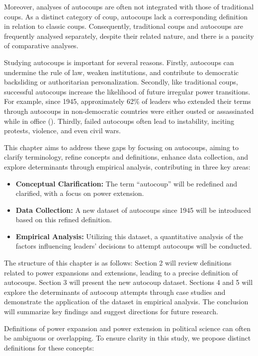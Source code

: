 \documentclass[
  12pt,
]{report}
\begin{document}
Moreover, analyses of autocoups are often not integrated with those of
traditional coups. As a distinct category of coup, autocoups lack a
corresponding definition in relation to classic coups. Consequently,
traditional coups and autocoups are frequently analysed separately,
despite their related nature, and there is a paucity of comparative
analyses.

Studying autocoups is important for several reasons. Firstly, autocoups
can undermine the rule of law, weaken institutions, and contribute to
democratic backsliding or authoritarian personalization. Secondly, like
traditional coups, successful autocoups increase the likelihood of
future irregular power transitions. For example, since 1945,
approximately 62\% of leaders who extended their terms through autocoups
in non-democratic countries were either ousted or assassinated while in
office (). Thirdly, failed
autocoups often lead to instability, inciting protests, violence, and
even civil wars.

This chapter aims to address these gaps by focusing on autocoups, aiming
to clarify terminology, refine concepts and definitions, enhance data
collection, and explore determinants through empirical analysis,
contributing in three key areas:

\begin{itemize}
\item
  \textbf{Conceptual Clarification:} The term ``autocoup'' will be
  redefined and clarified, with a focus on power extension.
\item
  \textbf{Data Collection:} A new dataset of autocoups since 1945 will
  be introduced based on this refined definition.
\item
  \textbf{Empirical Analysis:} Utilizing this dataset, a quantitative
  analysis of the factors influencing leaders' decisions to attempt
  autocoups will be conducted.
\end{itemize}

The structure of this chapter is as follows: Section 2 will review
definitions related to power expansions and extensions, leading to a
precise definition of autocoups. Section 3 will present the new autocoup
dataset. Sections 4 and 5 will explore the determinants of autocoup
attempts through case studies and demonstrate the application of the
dataset in empirical analysis. The conclusion will summarize key
findings and suggest directions for future research.

Definitions of power expansion and power extension in political science
can often be ambiguous or overlapping. To ensure clarity in this study,
we propose distinct definitions for these concepts:
\end{document}
